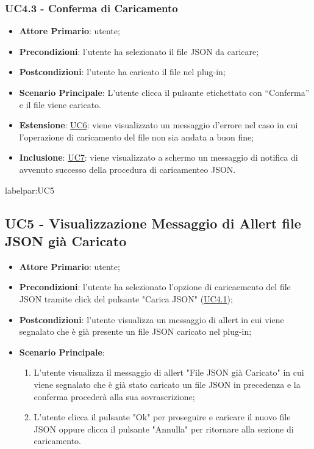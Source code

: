 		\subsubsection{UC4.3 - Conferma di Caricamento}
		\begin{itemize}
			\item\textbf{Attore Primario}: utente;
			\item\textbf{Precondizioni}: l’utente ha selezionato il file JSON da caricare;
			\item\textbf{Postcondizioni}: l’utente ha caricato il file nel plug-in; 
			\item\textbf{Scenario Principale}: L’utente clicca il pulsante etichettato con “Conferma” e il file viene caricato.
			\item\textbf{Estensione}: \hyperref[par:UC6]{UC6}: viene visualizzato un messaggio d’errore nel caso in cui l’operazione di caricamento del file non sia andata a buon fine;				
			\item\textbf{Inclusione}: \hyperref[par:UC7]{UC7}: viene visualizzato a schermo un messaggio di notifica di avvenuto successo della procedura di caricamenteo JSON.	
		\end{itemize}

	
	label{par:UC5}
	\subsection{UC5 - Visualizzazione Messaggio di Allert file JSON già Caricato}
		\begin{itemize}
			\item\textbf{Attore Primario}: utente;
			\item\textbf{Precondizioni}: l’utente ha selezionato l'opzione di caricaemento del file JSON tramite click del pulsante "Carica JSON" (\hyperref[par:UC4.1]{UC4.1});
			\item\textbf{Postcondizioni}: l’utente visualizza un messaggio di allert in cui viene segnalato che è già presente un file JSON caricato nel plug-in; 
			\item\textbf{Scenario Principale}: 
				\begin{enumerate} 
					\item L’utente visualizza il messaggio di allert "File JSON già Caricato" in cui viene segnalato che è già stato caricato un file JSON in precedenza e la conferma procederà alla sua sovrascrizione;
					\item L'utente clicca il pulsante "Ok" per proseguire e caricare il nuovo file JSON oppure clicca il pulsante "Annulla" per ritornare alla sezione di caricamento.
				\end{enumerate}
		\end{itemize}	

